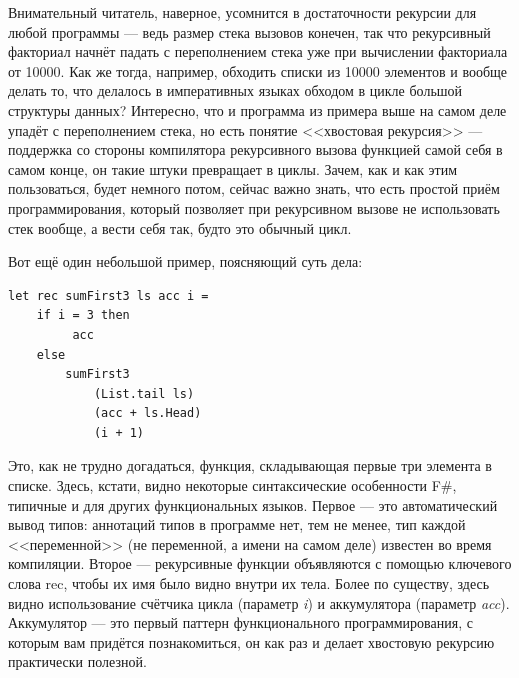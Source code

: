 \documentclass[a5paper]{article}
\begin{document}
Внимательный читатель, наверное, усомнится в достаточности рекурсии для любой программы --- ведь размер стека вызовов конечен, так что рекурсивный факториал начнёт падать с переполнением стека уже при вычислении факториала от 10000. Как же тогда, например, обходить списки из 10000 элементов и вообще делать то, что делалось в императивных языках обходом в цикле большой структуры данных? Интересно, что и программа из примера выше на самом деле упадёт с переполнением стека, но есть понятие <<хвостовая рекурсия>> --- поддержка со стороны компилятора рекурсивного вызова функцией самой себя в самом конце, он такие штуки превращает в циклы. Зачем, как и как этим пользоваться, будет немного потом, сейчас важно знать, что есть простой приём программирования, который позволяет при рекурсивном вызове не использовать стек вообще, а вести себя так, будто это обычный цикл.

Вот ещё один небольшой пример, поясняющий суть дела:
\begin{verbatim}
let rec sumFirst3 ls acc i =
    if i = 3 then 
         acc 
    else 
        sumFirst3 
            (List.tail ls) 
            (acc + ls.Head) 
            (i + 1)
\end{verbatim}

Это, как не трудно догадаться, функция, складывающая первые три элемента в списке. Здесь, кстати, видно некоторые синтаксические особенности F\#, типичные и для других функциональных языков. Первое --- это автоматический вывод типов: аннотаций типов в программе нет, тем не менее, тип каждой <<переменной>> (не переменной, а имени на самом деле) известен во время компиляции. Второе --- рекурсивные функции объявляются с помощью ключевого слова rec, чтобы их имя было видно внутри их тела. Более по существу, здесь видно использование счётчика цикла (параметр \textit{i}) и аккумулятора (параметр \textit{acc}). Аккумулятор --- это первый паттерн функционального программирования, с которым вам придётся познакомиться, он как раз и делает хвостовую рекурсию практически полезной. 
\end{document}

